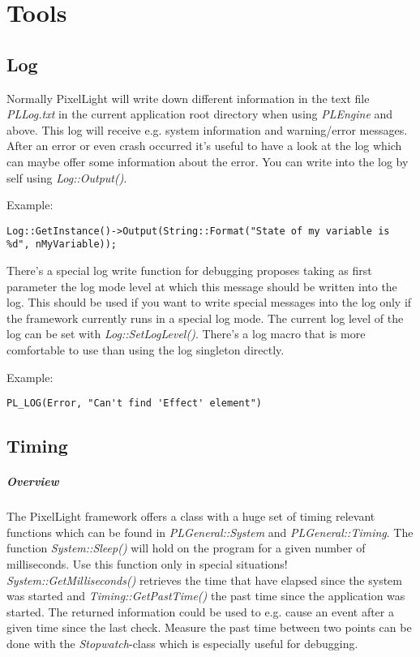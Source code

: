 \chapter{Tools}




\section{Log}
Normally PixelLight will write down different information in the text file \emph{PLLog.txt} in the current application root directory when using \emph{PLEngine} and above. This log will receive e.g. system information and warning/error messages. After an error or even crash occurred it's useful to have a look at the log which can maybe offer some information about the error. You can write into the log by self using \emph{Log::Output()}.

Example:

\begin{lstlisting}[caption=Using the log singleton directly]
Log::GetInstance()->Output(String::Format("State of my variable is %d", nMyVariable));
\end{lstlisting}

There's a special log write function for debugging proposes taking as first parameter the log mode level at which this message should be written into the log. This should be used if you want to write special messages into the log only if the framework currently runs in a special log mode. The current log level of the log can be set with \emph{Log::SetLogLevel()}. There's a log macro that is more comfortable to use than using the log singleton directly.

Example:

\begin{lstlisting}[caption=Using the log singleton though the log macros]
PL_LOG(Error, "Can't find 'Effect' element")
\end{lstlisting}





\section{Timing}


\paragraph{Overview}
The PixelLight framework offers a class with a huge set of timing relevant functions which can be found in \emph{PLGeneral::System} and \emph{PLGeneral::Timing}. The function \emph{System::Sleep()} will hold on the program for a given number of milliseconds. Use this function only in special situations! \emph{System::GetMilliseconds()} retrieves the time that have elapsed since the system was started and \emph{Timing::GetPastTime()} the past time since the application was started. The returned information could be used to e.g. cause an event after a given time since the last check. Measure the past time between two points can be done with the \emph{Stopwatch}-class which is especially useful for debugging.


